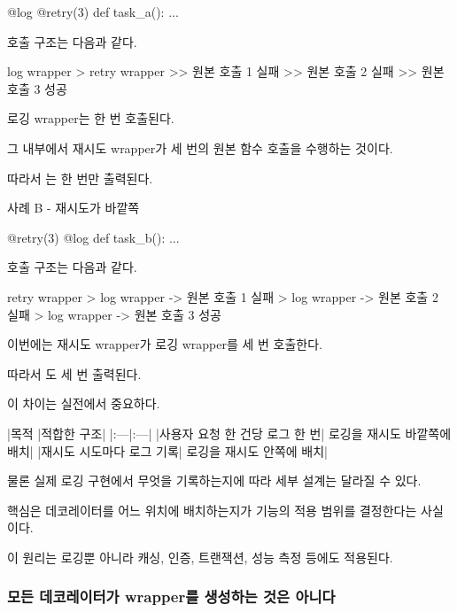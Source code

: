 \begin{dhkcode}
@log
@retry(3)
def task_a():
    ...
\end{dhkcode}

호출 구조는 다음과 같다.

\begin{dhkdir}[in=6]
log wrapper
> retry wrapper
>> 원본 호출 1 실패
>> 원본 호출 2 실패
>> 원본 호출 3 성공
\end{dhkdir}

로깅 wrapper는 한 번 호출된다.

그 내부에서 재시도 wrapper가 세 번의 원본 함수 호출을 수행하는 것이다.

따라서 는 한 번만 출력된다.

\begin{dhknote}
\begin{dhksmry}[centered]
사례 B - 재시도가 바깥쪽
\end{dhksmry}
\end{dhknote}

\begin{dhkcode}
@retry(3)
@log
def task_b():
    ...
\end{dhkcode}

호출 구조는 다음과 같다.

\begin{dhkdir}[in=6]
retry wrapper
> log wrapper -> 원본 호출 1 실패
> log wrapper -> 원본 호출 2 실패
> log wrapper -> 원본 호출 3 성공
\end{dhkdir}

이번에는 재시도 wrapper가 로깅 wrapper를 세 번 호출한다.

따라서 도 세 번 출력된다.

이 차이는 실전에서 중요하다.

\begin{dhktable}
|목적	|적합한 구조|
|:---|:---|
|사용자 요청 한 건당 로그 한 번|	로깅을 재시도 바깥쪽에 배치|
|재시도 시도마다 로그 기록|	로깅을 재시도 안쪽에 배치|
\end{dhktable}

물론 실제 로깅 구현에서 무엇을 기록하는지에 따라 세부 설계는 달라질 수 있다.

핵심은 데코레이터를 어느 위치에 배치하는지가 기능의 적용 범위를 결정한다는 사실이다.

이 원리는 로깅뿐 아니라 캐싱, 인증, 트랜잭션, 성능 측정 등에도 적용된다.

\subsubsection{모든 데코레이터가 wrapper를 생성하는 것은 아니다}

